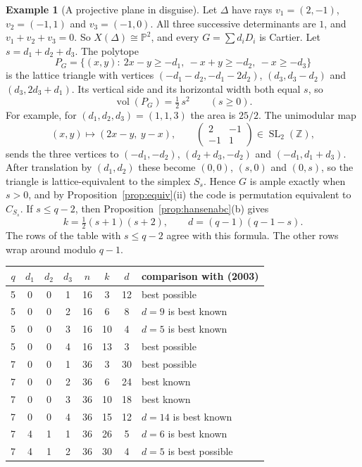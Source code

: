 \documentclass[12pt,letterpaper]{article}
\numberwithin{equation}{section}
\theoremstyle{definition}
\newtheorem{example}[theorem]{Example}
\theoremstyle{remark}
\DeclareMathOperator{\vol}{vol}
\newcommand{\Z}{\mathbb{Z}}
\newcommand{\PP}{\mathbb{P}}
\begin{document}
\begin{example}[A projective plane in disguise]\label{example:fan6}
Let $\Delta$ have rays $v_1=(2,-1)$, $v_2=(-1,1)$ and $v_3=(-1,0)$. All three
successive determinants are $1$, and $v_1+v_2+v_3=0$. So $X(\Delta)\cong\PP^2$,
and every $G=\sum d_iD_i$ is Cartier. Let $s=d_1+d_2+d_3$. The polytope
\[
P_G=\{(x,y):\ 2x-y\ge-d_1,\ -x+y\ge-d_2,\ -x\ge-d_3\}
\]
is the lattice triangle with vertices $(-d_1-d_2,-d_1-2d_2)$, $(d_3,d_3-d_2)$
and $(d_3,2d_3+d_1)$. Its vertical side and its horizontal width both equal $s$,
so
\[
\vol(P_G)=\tfrac12\,s^2 \qquad(s\ge0).
\]
For example, for $(d_1,d_2,d_3)=(1,1,3)$ the area is $25/2$. The unimodular
map
\[
(x,y)\longmapsto(2x-y,\ y-x),\qquad
\begin{pmatrix}2&-1\\-1&1\end{pmatrix}\in\operatorname{SL}_2(\Z),
\]
sends the three vertices to $(-d_1,-d_2)$, $(d_2+d_3,-d_2)$ and
$(-d_1,d_1+d_3)$. After translation by $(d_1,d_2)$ these become $(0,0)$,
$(s,0)$ and $(0,s)$, so the triangle is lattice-equivalent to the simplex
$S_s$. Hence $G$ is ample exactly when $s>0$, and by
Proposition~\ref{prop:equiv}(ii) the code is permutation equivalent to
$C_{S_s}$. If $s\le q-2$, then
Proposition~\ref{prop:hansenabc}(b) gives
\[
k=\tfrac12(s+1)(s+2),\qquad d=(q-1)(q-1-s).
\]
The rows of the table with $s\le q-2$ agree with this formula. The other rows
wrap around modulo $q-1$.
\begin{center}
\small
\begin{tabular}{@{}cccccccl@{}}
\toprule
$q$ & $d_1$ & $d_2$ & $d_3$ & $n$ & $k$ & $d$ & comparison with \cite{Br98} (2003)\\
\midrule
5 & 0 & 0 & 1 & 16 & 3 & 12 & best possible\\
5 & 0 & 0 & 2 & 16 & 6 & 8 & $d=9$ is best known\\
5 & 0 & 0 & 3 & 16 & 10 & 4 & $d=5$ is best known\\
5 & 0 & 0 & 4 & 16 & 13 & 3 & best possible\\
7 & 0 & 0 & 1 & 36 & 3 & 30 & best possible\\
7 & 0 & 0 & 2 & 36 & 6 & 24 & best known\\
7 & 0 & 0 & 3 & 36 & 10 & 18 & best known\\
7 & 0 & 0 & 4 & 36 & 15 & 12 & $d=14$ is best known\\
7 & 4 & 1 & 1 & 36 & 26 & 5 & $d=6$ is best known\\
7 & 4 & 1 & 2 & 36 & 30 & 4 & $d=5$ is best possible\\

\end{tabular}
\end{center}
\end{example}
\end{document}
